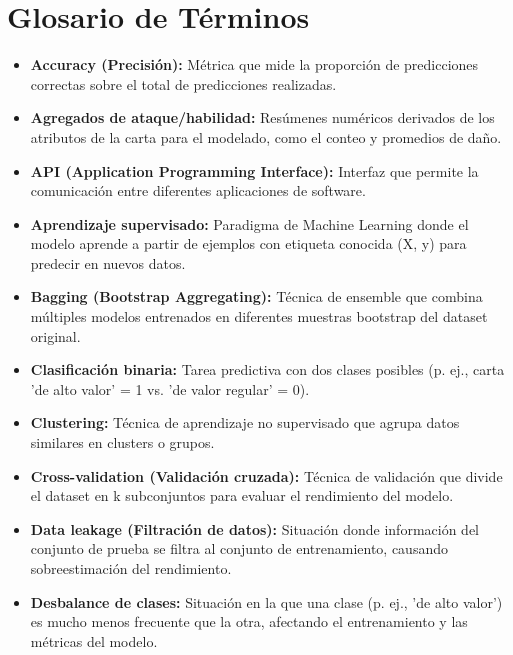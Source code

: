 \documentclass[12pt,letterpaper]{article}
\begin{document}
\newpage

\section{Glosario de Términos}

\begin{itemize}
    \item \textbf{Accuracy (Precisión):} Métrica que mide la proporción de predicciones correctas sobre el total de predicciones realizadas.
    
    \item \textbf{Agregados de ataque/habilidad:} Resúmenes numéricos derivados de los atributos de la carta para el modelado, como el conteo y promedios de daño.
    
    \item \textbf{API (Application Programming Interface):} Interfaz que permite la comunicación entre diferentes aplicaciones de software.
    
    \item \textbf{Aprendizaje supervisado:} Paradigma de Machine Learning donde el modelo aprende a partir de ejemplos con etiqueta conocida (X, y) para predecir en nuevos datos.
    
    \item \textbf{Bagging (Bootstrap Aggregating):} Técnica de ensemble que combina múltiples modelos entrenados en diferentes muestras bootstrap del dataset original.
    
    \item \textbf{Clasificación binaria:} Tarea predictiva con dos clases posibles (p. ej., carta 'de alto valor' = 1 vs. 'de valor regular' = 0).
    
    \item \textbf{Clustering:} Técnica de aprendizaje no supervisado que agrupa datos similares en clusters o grupos.
    
    \item \textbf{Cross-validation (Validación cruzada):} Técnica de validación que divide el dataset en k subconjuntos para evaluar el rendimiento del modelo.
    
    \item \textbf{Data leakage (Filtración de datos):} Situación donde información del conjunto de prueba se filtra al conjunto de entrenamiento, causando sobreestimación del rendimiento.
    
    \item \textbf{Desbalance de clases:} Situación en la que una clase (p. ej., 'de alto valor') es mucho menos frecuente que la otra, afectando el entrenamiento y las métricas del modelo.
    

\end{itemize}
\end{document}
